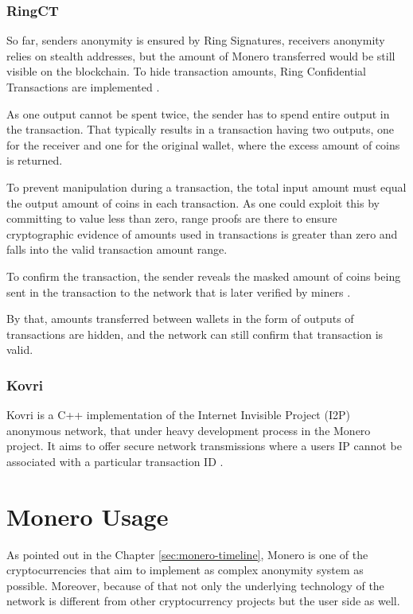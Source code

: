 \documentclass[
  printed, %
  table,   %
  lof,     %
  lot,     %
           oneside, color
]{fithesis3}
\begin{document}
\subsection{RingCT}
\label{sec:ringct}
So far, senders anonymity is ensured by Ring Signatures, receivers anonymity relies on stealth addresses, but the amount of Monero transferred would be still visible on the blockchain. To hide transaction amounts, Ring Confidential Transactions are implemented \cite{noether2015ring}.

As one output cannot be spent twice, the sender has to spend entire output in the transaction. That typically results in a transaction having two outputs, one for the receiver and one for the original wallet, where the excess amount of coins is returned.	 

To prevent manipulation during a transaction, the total input amount must equal the output amount of coins in each transaction. As one could exploit this by committing to value less than zero, range proofs are there to ensure cryptographic evidence of amounts used in transactions is greater than zero and falls into the valid transaction amount range. 

To confirm the transaction, the sender reveals the masked amount of coins being sent in the transaction to the network that is later verified by miners \cite{sun2017ringct}. 

By that, amounts transferred between wallets in the form of outputs of transactions are hidden, and the network can still confirm that transaction is valid.

\subsection{Kovri}
Kovri is a C++ implementation of the Internet Invisible Project (I2P) anonymous network, that under heavy development process in the Monero project. It aims to offer secure network transmissions where a users IP cannot be associated with a particular transaction ID \cite{monerokovri}. 

\chapter{Monero Usage}
As pointed out in the Chapter \ref{sec:monero-timeline}, Monero is one of the cryptocurrencies that aim to implement as complex anonymity system as possible. Moreover, because of that not only the underlying technology of the network is different from other cryptocurrency projects but the user side as well. 
\end{document}
